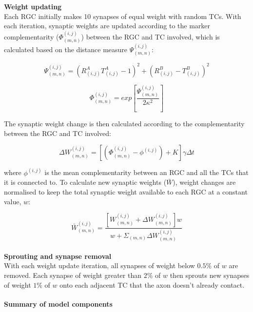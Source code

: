 \documentclass[11pt]{"article"}
\begin{document}
\textbf{Weight updating}\\
Each RGC initially makes 10 synapses of equal weight with random TCs. With each iteration, synaptic weights are updated according to the marker complementarity ($\Phi^{(i,j)}_{(m,n)}$) between the RGC and TC involved, which is calculated based on the distance measure $\Psi^{(i,j)}_{(m,n)}$:

\begin{equation}
\Psi^{(i,j)}_{(m,n)} = (R_{(i,j)}^A T_{(i,j)}^A - 1)^2 + (R_{(i,j)}^B - T_{(i,j)}^B)^2
\end{equation}

\begin{equation}
\Phi^{(i,j)}_{(m,n)} = exp\left[\frac{\Psi^{(i,j)}_{(m,n)}}{2\kappa ^2}\right]
\end{equation}

The synaptic weight change is then calculated according to the complementarity between the RGC and TC involved:

\begin{equation}
\Delta W^{(i,j)}_{(m,n)} = \left[ (\Phi^{(i,j)}_{(m,n)} - \phi^{(i,j)}) + K \right] \gamma \Delta t 
\end{equation}

where $\phi^{(i,j)}$ is the mean complementarity between an RGC and all the TCs that it is connected to. To calculate new synaptic weights ($\bar{W}$), weight changes are normalised to keep the total synaptic weight available to each RGC at a constant value, $w$:

\begin{equation}
\bar{W}^{(i,j)}_{(m,n)} = \frac{ [W^{(i,j)}_{(m,n)} + \Delta W^{(i,j)}_{(m,n)}] w}{w + \Sigma_{(m,n)} \Delta W^{(i,j)}_{(m,n)} }
\end{equation}
\\

\textbf{Sprouting and synapse removal}\\
With each weight update iteration, all synapses of weight below $0.5\%$ of $w$ are removed. Each synapse of weight greater than $2\%$ of $w$ then sprouts new synapses of weight $1\%$ of $w$ onto each adjacent TC that the axon doesn't already contact.
\\\\

\textbf{Summary of model components}\\
\end{document}
